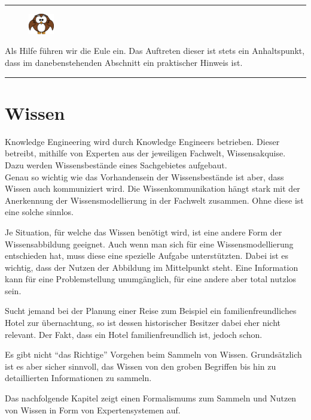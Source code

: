 \noindent\rule[1ex]{\textwidth}{1pt}
\begin{figure}
    \vspace{-21pt}
    \includegraphics[width=0.1\textwidth]{bilder/owl.png}
\end{figure}
Als Hilfe führen wir die Eule ein. Das Auftreten dieser ist stets ein Anhaltspunkt, dass im danebenstehenden Abschnitt ein praktischer Hinweis ist.

\noindent\rule[1ex]{\textwidth}{1pt}

\newpage

\section{Wissen}
\label{chap:einleitung_wissen}


Knowledge Engineering wird durch Knowledge Engineers betrieben. Dieser betreibt, mithilfe von Experten aus der jeweiligen Fachwelt, Wissensakquise. Dazu werden Wissensbestände eines Sachgebietes aufgebaut. \\
Genau so wichtig wie das Vorhandensein der Wissensbestände ist aber, dass Wissen auch kommuniziert wird. Die Wissenkommunikation hängt stark mit der Anerkennung der Wissensmodellierung in der Fachwelt zusammen. Ohne diese ist eine solche sinnlos.

Je Situation, für welche das Wissen benötigt wird, ist eine andere Form der Wissensabbildung geeignet. Auch wenn man sich für eine Wissensmodellierung entschieden hat, muss diese eine spezielle Aufgabe unterstützten. Dabei ist es wichtig, dass der Nutzen der Abbildung im Mittelpunkt steht. Eine Information kann für eine Problemstellung unumgänglich, für eine andere aber total nutzlos sein.

Sucht jemand bei der Planung einer Reise zum Beispiel ein familienfreundliches Hotel zur übernachtung, so ist dessen historischer Besitzer dabei eher nicht relevant. Der Fakt, dass ein Hotel familienfreundlich ist, jedoch schon.

Es gibt nicht ``das Richtige'' Vorgehen beim Sammeln von Wissen. Grundsätzlich ist es aber sicher sinnvoll, das Wissen von den groben Begriffen bis hin zu detaillierten Informationen zu sammeln.

Das nachfolgende Kapitel zeigt einen Formalismums zum Sammeln und Nutzen von Wissen in Form von Expertensystemen auf.
